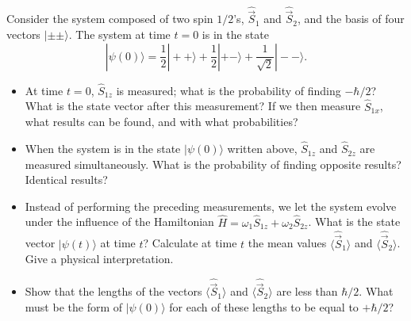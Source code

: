 \documentclass[12pt,a4paper]{article}
\newenvironment{problem}[2][Problem]{\begin{trivlist}
\item[\hskip \labelsep {\bfseries #1}\hskip \labelsep {\bfseries #2.}]}{\end{trivlist}}
\begin{document}
\begin{problem}{3}
[C-T Exercise 4-6] Consider the system composed of two spin $1/2$'s, $\hat{\vec{S}}_1$ and $\hat{\vec{S}}_2$, and the basis of four vectors $|\pm\pm\rangle$. The system at time $t=0$ is in the state
\[
|\psi(0)\rangle=\frac{1}{2}|++\rangle+\frac{1}{2}|+-\rangle+\frac{1}{\sqrt{2}}|--\rangle.
\]
\begin{itemize}
\item[(a)] At time $t=0$, $\hat{S}_{1z}$ is measured; what is the probability of finding $-\hbar/2$? What is the state vector after this measurement? If we then measure $\hat{S}_{1x}$, what results can be found, and with what probabilities?
\item[(b)] When the system is in the state $|\psi(0)\rangle$ written above, $\hat{S}_{1z}$ and $\hat{S}_{2z}$ are measured simultaneously. What is the probability of finding opposite results? Identical results?
\item[(c)] Instead of performing the preceding measurements, we let the system evolve under the influence of the Hamiltonian $\hat{H}=\omega_1\hat{S}_{1z}+\omega_2\hat{S}_{2z}$. What is the state vector $|\psi(t)\rangle$ at time $t$? Calculate at time $t$ the mean values $\langle\hat{\vec{S}}_1\rangle$ and $\langle\hat{\vec{S}}_2\rangle$. Give a physical interpretation.
\item[(d)] Show that the lengths of the vectors $\langle\hat{\vec{S}}_1\rangle$ and $\langle\hat{\vec{S}}_2\rangle$ are less than $\hbar/2$. What must be the form of $|\psi(0)\rangle$ for each of these lengths to be equal to $+\hbar/2$?
\end{itemize}
\end{problem}
\end{document}
